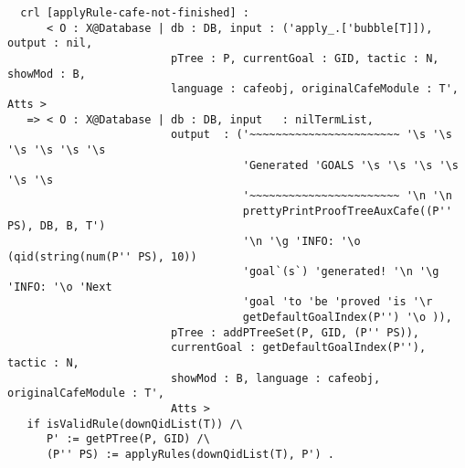 {\codesize
\begin{verbatim}
  crl [applyRule-cafe-not-finished] :
      < O : X@Database | db : DB, input : ('apply_.['bubble[T]]), output : nil,
                         pTree : P, currentGoal : GID, tactic : N, showMod : B,
                         language : cafeobj, originalCafeModule : T', Atts >
   => < O : X@Database | db : DB, input   : nilTermList,
                         output  : ('~~~~~~~~~~~~~~~~~~~~~~~ '\s '\s '\s '\s '\s '\s
                                    'Generated 'GOALS '\s '\s '\s '\s '\s '\s
                                    '~~~~~~~~~~~~~~~~~~~~~~~ '\n '\n
                                    prettyPrintProofTreeAuxCafe((P'' PS), DB, B, T')
                                    '\n '\g 'INFO: '\o (qid(string(num(P'' PS), 10))
                                    'goal`(s`) 'generated! '\n '\g 'INFO: '\o 'Next
                                    'goal 'to 'be 'proved 'is '\r
                                    getDefaultGoalIndex(P'') '\o )),
                         pTree : addPTreeSet(P, GID, (P'' PS)),
                         currentGoal : getDefaultGoalIndex(P''), tactic : N,
                         showMod : B, language : cafeobj, originalCafeModule : T',
                         Atts >
   if isValidRule(downQidList(T)) /\
      P' := getPTree(P, GID) /\
      (P'' PS) := applyRules(downQidList(T), P') .
\end{verbatim}
}
